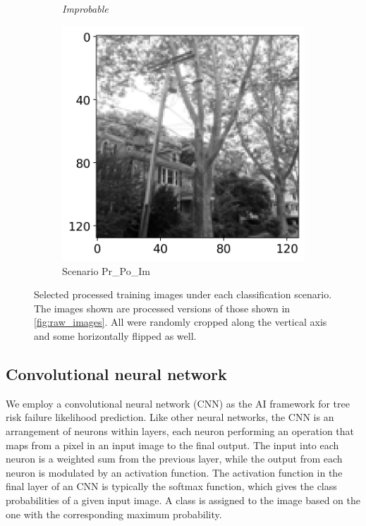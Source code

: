 \documentclass[Journal,letterpaper, SingleSpace, InsideFigs]{ascelike-new}
\begin{document}
\begin{figure}[h!]
\begin{subfigure}[b]{.24\linewidth}
    \textit{\footnotesize Improbable}
    
    \includegraphics[width=\textwidth]{processed-improbable-example-2-flipped}
    \caption{Scenario Pr\_Po\_Im}
    \label{pr_po_im_64}
  \end{subfigure}%
  
  \caption{Selected processed training images under each classification scenario.
    The images shown are processed versions of those shown in \autoref{fig:raw_images}.
    All were randomly cropped along the vertical axis and some horizontally flipped as well.
  }
  \label{fig:processed_images}
\end{figure}

\subsection{Convolutional neural network}
We employ a convolutional neural network (CNN) as the AI framework for tree risk failure likelihood prediction.
Like other neural networks, the CNN is an arrangement of neurons within layers, each neuron performing an operation that maps from a pixel in an input image to the final output. 
The input into each neuron is a weighted sum from the previous layer, while the output from each neuron is modulated by an activation function.
The activation function in the final layer of an CNN is typically the softmax function, which gives the class probabilities of a given input image. 
A class is assigned to the image based on the one with the corresponding maximum probability.
\end{document}
